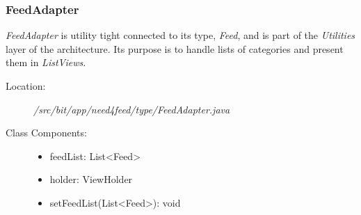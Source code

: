\subsubsection{FeedAdapter}
\textit{FeedAdapter} is utility tight connected to its type, \textit{Feed}, and is part of the \textit{Utilities} layer of the architecture. Its purpose is to handle lists of categories and present them in \textit{ListViews}.
\begin{description}
  \item[Location:] \textit{/src/bit/app/need4feed/type/FeedAdapter.java} \hfill
  \item[Class Components:] \hfill
     \begin{itemize}
        \item feedList: List\textless Feed\textgreater
        \item holder: ViewHolder
		\item setFeedList(List\textless Feed\textgreater): void 
     \end{itemize}
\end{description}


